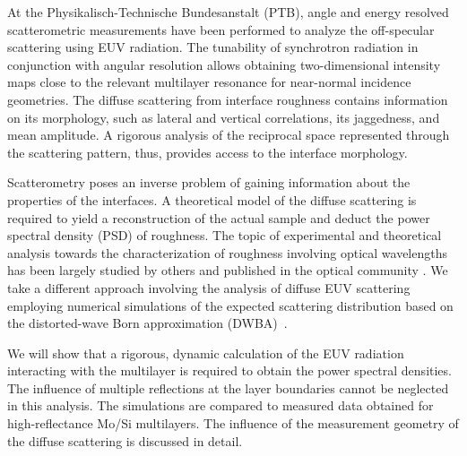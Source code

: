At the Physikalisch-Technische Bundesanstalt (PTB), angle and energy resolved scatterometric measurements have been performed to analyze the off-specular scattering using EUV radiation. The tunability of synchrotron radiation in conjunction with angular resolution allows obtaining two-dimensional intensity maps close to the relevant multilayer resonance for near-normal incidence geometries. The diffuse scattering from interface roughness contains information on its morphology, such as lateral and vertical correlations, its jaggedness, and mean amplitude. A rigorous analysis of the reciprocal space represented through the scattering pattern, thus, provides access to the interface morphology.

Scatterometry poses an inverse problem of gaining information about the properties of the interfaces. A theoretical model of the diffuse scattering is required to yield a reconstruction of the actual sample and deduct the power spectral density (PSD) of roughness. The topic of experimental and theoretical analysis towards the characterization of roughness involving optical wavelengths has been largely studied by others and published in the optical community \cite{amra_light_1993, amra_light_1994, elson_light_1980, elson_relationship_1983, schroder_angle-resolved_2011, schroder_spectral_2014}. We take a different approach involving the analysis of diffuse EUV scattering employing numerical simulations of the expected scattering distribution based on the distorted-wave Born approximation (DWBA)~\cite{holy_nonspecular_1994, holy_x-ray_1993}.

We will show that a rigorous, dynamic calculation of the EUV radiation interacting with the multilayer is required to obtain the power spectral densities. The influence of multiple reflections at the layer boundaries cannot be neglected in this analysis. The simulations are compared to measured data obtained for high-reflectance Mo/Si multilayers. The influence of the measurement geometry of the diffuse scattering is discussed in detail.

